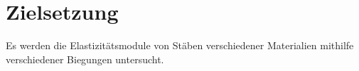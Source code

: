 
\section{Zielsetzung}
\label{sec:Zielsetzung}
Es werden die Elastizitätsmodule von Stäben verschiedener Materialien mithilfe verschiedener Biegungen untersucht.
